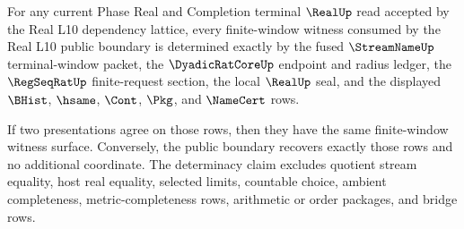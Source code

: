\begin{theorem}
\label{thm:real-l10-finite-window-witness-determinacy}
For any current Phase Real and Completion terminal $\RealUp$ read accepted by the Real L10 dependency lattice, every finite-window witness consumed by the Real L10 public boundary is determined exactly by the fused $\StreamNameUp$ terminal-window packet, the $\DyadicRatCoreUp$ endpoint and radius ledger, the $\RegSeqRatUp$ finite-request section, the local $\RealUp$ seal, and the displayed $\BHist$, $\hsame$, $\Cont$, $\Pkg$, and $\NameCert$ rows.

If two presentations agree on those rows, then they have the same finite-window witness surface. Conversely, the public boundary recovers exactly those rows and no additional coordinate. The determinacy claim excludes quotient stream equality, host real equality, selected limits, countable choice, ambient completeness, metric-completeness rows, arithmetic or order packages, and bridge rows.
\end{theorem}
